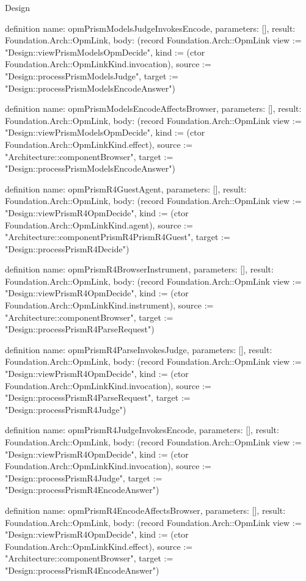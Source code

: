 \begin{lexlean}{Design}
\begin{semanticmodule}
definition{
  name: opmPrismModelsJudgeInvokesEncode,
  parameters: [],
  result: Foundation.Arch::OpmLink,
  body: (record Foundation.Arch::OpmLink {view := "Design::viewPrismModelsOpmDecide", kind := (ctor Foundation.Arch::OpmLinkKind.invocation), source := "Design::processPrismModelsJudge", target := "Design::processPrismModelsEncodeAnswer"})
}

definition{
  name: opmPrismModelsEncodeAffectsBrowser,
  parameters: [],
  result: Foundation.Arch::OpmLink,
  body: (record Foundation.Arch::OpmLink {view := "Design::viewPrismModelsOpmDecide", kind := (ctor Foundation.Arch::OpmLinkKind.effect), source := "Architecture::componentBrowser", target := "Design::processPrismModelsEncodeAnswer"})
}

definition{
  name: opmPrismR4GuestAgent,
  parameters: [],
  result: Foundation.Arch::OpmLink,
  body: (record Foundation.Arch::OpmLink {view := "Design::viewPrismR4OpmDecide", kind := (ctor Foundation.Arch::OpmLinkKind.agent), source := "Architecture::componentPrismR4PrismR4Guest", target := "Design::processPrismR4Decide"})
}

definition{
  name: opmPrismR4BrowserInstrument,
  parameters: [],
  result: Foundation.Arch::OpmLink,
  body: (record Foundation.Arch::OpmLink {view := "Design::viewPrismR4OpmDecide", kind := (ctor Foundation.Arch::OpmLinkKind.instrument), source := "Architecture::componentBrowser", target := "Design::processPrismR4ParseRequest"})
}

definition{
  name: opmPrismR4ParseInvokesJudge,
  parameters: [],
  result: Foundation.Arch::OpmLink,
  body: (record Foundation.Arch::OpmLink {view := "Design::viewPrismR4OpmDecide", kind := (ctor Foundation.Arch::OpmLinkKind.invocation), source := "Design::processPrismR4ParseRequest", target := "Design::processPrismR4Judge"})
}

definition{
  name: opmPrismR4JudgeInvokesEncode,
  parameters: [],
  result: Foundation.Arch::OpmLink,
  body: (record Foundation.Arch::OpmLink {view := "Design::viewPrismR4OpmDecide", kind := (ctor Foundation.Arch::OpmLinkKind.invocation), source := "Design::processPrismR4Judge", target := "Design::processPrismR4EncodeAnswer"})
}

definition{
  name: opmPrismR4EncodeAffectsBrowser,
  parameters: [],
  result: Foundation.Arch::OpmLink,
  body: (record Foundation.Arch::OpmLink {view := "Design::viewPrismR4OpmDecide", kind := (ctor Foundation.Arch::OpmLinkKind.effect), source := "Architecture::componentBrowser", target := "Design::processPrismR4EncodeAnswer"})
}


\end{semanticmodule}
\end{lexlean}
